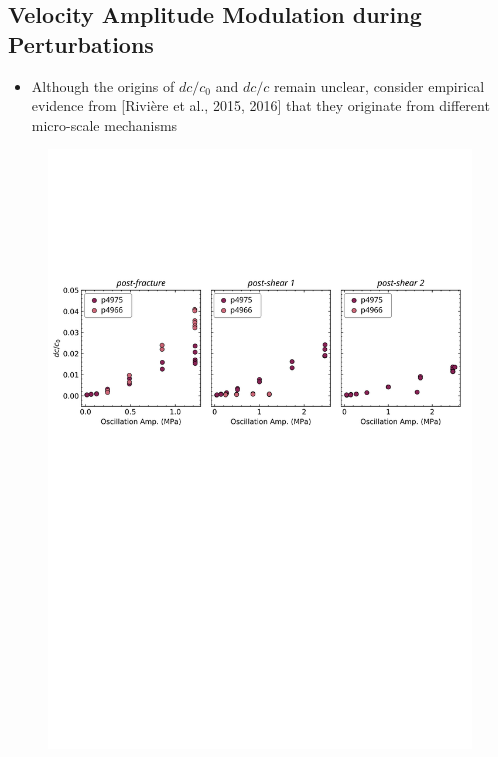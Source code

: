 \documentclass[letterpaper,10pt]{article}
\begin{document}
\newpage


\subsection{Velocity Amplitude Modulation during Perturbations}




\begin{itemize}
	\item Although the origins of $dc/c_0 $ and $ dc/c $ remain unclear, consider empirical evidence from [Rivière et al., 2015, 2016] that they originate from different micro-scale mechanisms 
\end{itemize}


\begin{figure}[ht]
	\centering
	\includegraphics[width=1\columnwidth]{Dc_NS_amp}

\end{figure}
\end{document}
